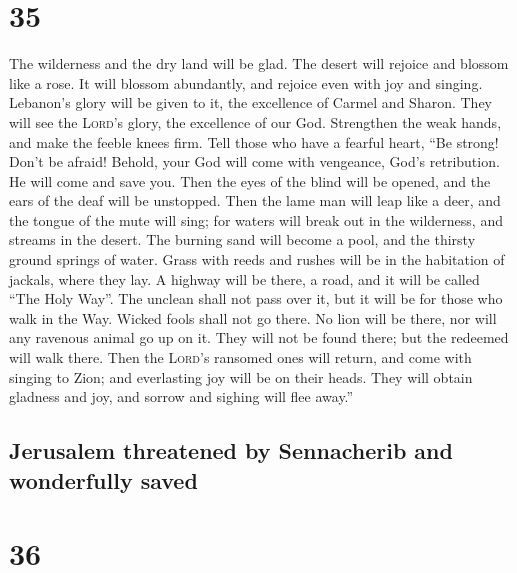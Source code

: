 \hypertarget{section-34}{%
\section{35}\label{section-34}}

 The wilderness and the dry land will be glad. The desert
will rejoice and blossom like a rose.  It will blossom
abundantly, and rejoice even with joy and singing. Lebanon's glory will
be given to it, the excellence of Carmel and Sharon. They will see the
\textsc{Lord}'s glory, the excellence of our God. 
Strengthen the weak hands, and make the feeble knees firm.
 Tell those who have a fearful heart, ``Be strong! Don't
be afraid! Behold, your God will come with vengeance, God's retribution.
He will come and save you.  Then the eyes of the blind
will be opened, and the ears of the deaf will be unstopped.
 Then the lame man will leap like a deer, and the tongue
of the mute will sing; for waters will break out in the wilderness, and
streams in the desert.  The burning sand will become a
pool, and the thirsty ground springs of water. Grass with reeds and
rushes will be in the habitation of jackals, where they lay.
 A highway will be there, a road, and it will be called
``The Holy Way''. The unclean shall not pass over it, but it will be for
those who walk in the Way. Wicked fools shall not go there.
 No lion will be there, nor will any ravenous animal go up
on it. They will not be found there; but the redeemed will walk there.
 Then the \textsc{Lord}'s ransomed ones will return, and
come with singing to Zion; and everlasting joy will be on their heads.
They will obtain gladness and joy, and sorrow and sighing will flee
away.''

\hypertarget{jerusalem-threatened-by-sennacherib-and-wonderfully-saved}{%
\subsection{Jerusalem threatened by Sennacherib and wonderfully
saved}\label{jerusalem-threatened-by-sennacherib-and-wonderfully-saved}}

\hypertarget{section-35}{%
\section{36}\label{section-35}}

